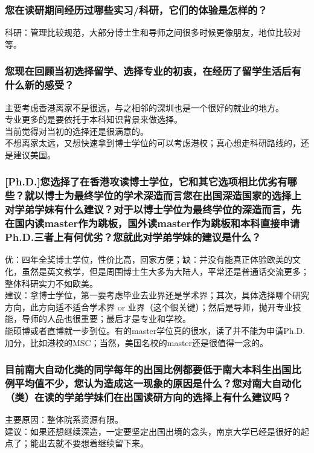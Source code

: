 \documentclass[a4paper,UTF8]{book}
\begin{document}
    \subsubsection*{您在读研期间经历过哪些实习/科研，它们的体验是怎样的？}
    科研：管理比较规范，大部分博士生和导师之间很多时候更像朋友，地位比较对等。
    
    \subsubsection*{您现在回顾当初选择留学、选择专业的初衷，在经历了留学生活后有什么新的感受？}
    主要考虑香港离家不是很远，与之相邻的深圳也是一个很好的就业的地方。\\
    专业更多的是要依托于本科知识背景来做选择。\\
    当前觉得对当初的选择还是很满意的。\\
    不想离家太远，又想快速拿到博士学位的可以考虑港校；真心想走科研路线的，还是建议美国。

    \subsubsection*{[Ph.D.]您选择了在香港攻读博士学位，它和其它选项相比优劣有哪些？就以博士为最终学位的学术深造而言您在出国深造国家的选择上对学弟学妹有什么建议？对于以博士学位为最终学位的深造而言，先在国内读master作为跳板，国外读master作为跳板和本科直接申请Ph.D.三者上有何优劣？您就此对学弟学妹的建议是什么？}
    优：四年全奖博士学位，性价比高，回家方便；缺：并没有能真正体验欧美的文化，虽然是英文教学，但是周围博士生大多为大陆人，平常还是普通话交流更多；整体科研实力不如欧美。\\
    建议：拿博士学位，第一要考虑毕业去业界还是学术界；其次，具体选择哪个研究方向，此方向适不适合学术界 or 业界（这个很关键）；然后是导师，抛开专业技能，导师的人品也很重要；最后才是专业和学校。\\
    能硕博或者直博就一步到位。有的master学位真的很水，读了并不能为申请Ph.D.加分，比如港校的MSC；当然，美国名校的master还是很值得一念的。

    \subsubsection*{目前南大自动化类的同学每年的出国比例都要低于南大本科生出国比例平均值不少，您认为造成这一现象的原因是什么？您对南大自动化（类）在读的学弟学妹们在出国读研方向的选择上有什么建议吗？}
    主要原因：整体院系资源有限。\\
    建议：如果还想继续深造，一定要坚定出国出境的念头，南京大学已经是很好的起点了；能出去就不要想着继续留下来。
\end{document}
